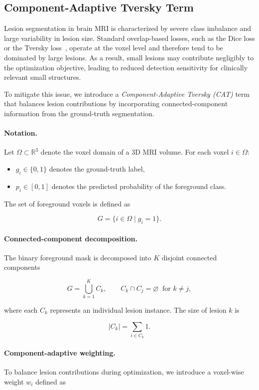 \subsection{Component-Adaptive Tversky Term}

Lesion segmentation in brain MRI is characterized by severe class imbalance
and large variability in lesion size. Standard overlap-based losses, such as
the Dice loss or the Tversky loss~\cite{salehi_tversky_2017}, operate at the
voxel level and therefore tend to be dominated by large lesions. As a result,
small lesions may contribute negligibly to the optimization objective,
leading to reduced detection sensitivity for clinically relevant small
structures.

To mitigate this issue, we introduce a \emph{Component-Adaptive Tversky (CAT)}
term that balances lesion contributions by incorporating connected-component
information from the ground-truth segmentation.

\paragraph{Notation.}
Let $\Omega \subset \mathbb{R}^3$ denote the voxel domain of a 3D MRI volume.
For each voxel $i \in \Omega$:

\begin{itemize}
    \item $g_i \in \{0,1\}$ denotes the ground-truth label,
    \item $p_i \in [0,1]$ denotes the predicted probability of the foreground class.
\end{itemize}

The set of foreground voxels is defined as

\[
G = \{ i \in \Omega \mid g_i = 1 \}.
\]

\paragraph{Connected-component decomposition.}
The binary foreground mask is decomposed into $K$ disjoint connected components

\[
G = \bigcup_{k=1}^{K} C_k, 
\qquad
C_k \cap C_j = \varnothing \;\; \text{for } k \neq j,
\]

where each $C_k$ represents an individual lesion instance.
The size of lesion $k$ is

\[
|C_k| = \sum_{i \in C_k} 1 .
\]

\paragraph{Component-adaptive weighting.}
To balance lesion contributions during optimization,
we introduce a voxel-wise weight $w_i$ defined as

